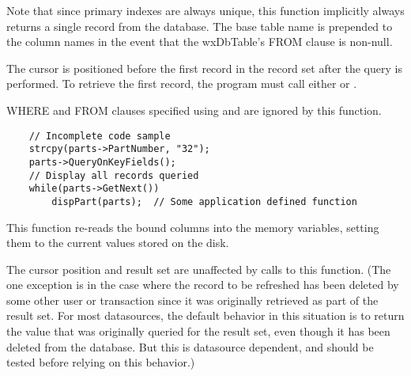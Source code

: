 Note that since primary indexes are always unique, this function implicitly 
always returns a single record from the database. The base table name is 
prepended to the column names in the event that the wxDbTable's FROM clause 
is non-null.




The cursor is positioned before the first record in the record set after 
the query is performed.  To retrieve the first record, the program must call 
either  or 
.

WHERE and FROM clauses specified using  
and  are ignored by 
this function.


\begin{verbatim}
    // Incomplete code sample
    strcpy(parts->PartNumber, "32");
    parts->QueryOnKeyFields();
    // Display all records queried
    while(parts->GetNext())
        dispPart(parts);  // Some application defined function
\end{verbatim}


\label{wxdbtablerefresh}


This function re-reads the bound columns into the memory variables, setting 
them to the current values stored on the disk.

The cursor position and result set are unaffected by calls to this function.
(The one exception is in the case where the record to be refreshed has been 
deleted by some other user or transaction since it was originally retrieved 
as part of the result set.  For most datasources, the default behavior in 
this situation is to return the value that was originally queried for the 
result set, even though it has been deleted from the database.  But this is 
datasource dependent, and should be tested before relying on this behavior.)


